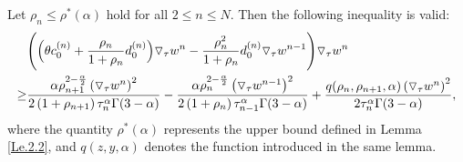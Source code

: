 \documentclass{siamart171218}
\theoremstyle{remark}
\theoremstyle{example}
\numberwithin{equation}{section}
\begin{document}
\begin{lemma}\label{Le.2.3}
  Let $\rho_{n} \leq \rho^*(\alpha)$ hold for all $2\leq n \leq N$. Then the following inequality is valid:
   	\begin{align*}
&	\Bigg{(}	\Big{(} \theta c_{0}^{(n)}+  \frac{\rho_{n}}{1+\rho_{n}}d_{0}^{(n)} \Big{)} \triangledown_\tau w^{n}
		-\frac{\rho_{n}^2}{1+\rho_{n}}d_{0}^{(n)} \triangledown_\tau w^{n-1} \Bigg{)} \triangledown_\tau w^{n}  \\
\ge &\frac{\alpha \rho_{n+1}^{2-\frac{\alpha}{2}} \left( \triangledown_\tau w^{n}\right)^2} {2 \left(1+\rho_{n+1}\right)\tau_{n}^\alpha \Gamma(3-\alpha)} -\frac{\alpha \rho_{n}^{2-\frac{\alpha}{2}} \left( \triangledown_\tau w^{n-1} \right)^2} {2 \left(1+\rho_{n}\right)\tau_{n-1}^\alpha \Gamma(3-\alpha)}+\frac{q(\rho_n,\rho_{n+1},\alpha) \left(\triangledown_\tau w^{n} \right)^2}{2\tau_{n}^\alpha \Gamma(3-\alpha)},
	\end{align*}
 where the quantity $\rho^*(\alpha)$ represents the upper bound defined in Lemma \ref{Le.2.2}, and $q(z,y,\alpha)$ denotes the function introduced in the same lemma.
\end{lemma}
\end{document}
